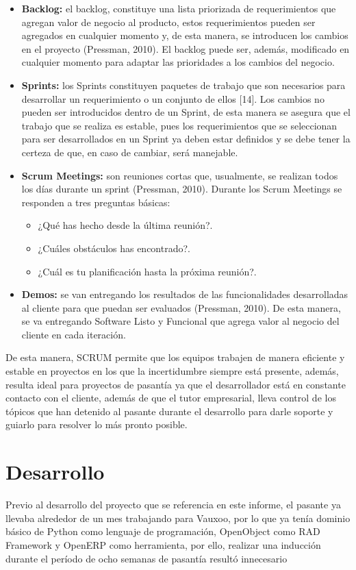 \documentclass[a4paper, 12pt]{article}
\begin{document}
\begin{itemize}
\item \textbf{Backlog:} el backlog, constituye una lista priorizada de requerimientos que agregan valor de negocio al producto, estos requerimientos pueden ser agregados en cualquier momento y, de esta manera, se introducen los cambios en el proyecto (Pressman, 2010). El backlog puede ser, además, modificado en cualquier momento para adaptar las prioridades a los cambios del negocio.
\item \textbf{Sprints:} los Sprints constituyen paquetes de trabajo que son necesarios para desarrollar un requerimiento o un conjunto de ellos [14]. Los cambios no pueden ser introducidos dentro de un Sprint, de esta manera se asegura que el trabajo que se realiza es estable, pues los requerimientos que se seleccionan para ser desarrollados en un Sprint ya deben estar definidos y se debe tener la certeza de que, en caso de cambiar, será manejable.
\item \textbf{Scrum Meetings:} son reuniones cortas que, usualmente, se realizan todos los días durante un sprint (Pressman, 2010). Durante los Scrum Meetings se responden a tres preguntas básicas:
\begin{itemize}
\item ¿Qué has hecho desde la última reunión?.
\item ¿Cuáles obstáculos has encontrado?.
\item ¿Cuál es tu planificación hasta la próxima reunión?.
\end{itemize}
\item \textbf{Demos:} se van entregando los resultados de las funcionalidades desarrolladas al cliente para que puedan ser evaluados (Pressman, 2010). De esta manera, se va entregando Software Listo y Funcional que agrega valor al negocio del cliente en cada iteración.
\end{itemize}

De esta manera, SCRUM permite que los equipos trabajen de manera eficiente y estable en proyectos en los que la incertidumbre siempre está presente, además, resulta ideal para proyectos de pasantía ya que el desarrollador está en constante contacto con el cliente, además de que el tutor empresarial, lleva control de los tópicos que han detenido al pasante durante el desarrollo para darle soporte y guiarlo para resolver lo más pronto posible.

\section{Desarrollo}
Previo al desarrollo del proyecto que se referencia en este informe, el pasante ya llevaba alrededor de un mes trabajando para Vauxoo, por lo que ya tenía dominio básico de Python como lenguaje de programación, OpenObject como RAD Framework y OpenERP como herramienta, por ello, realizar una inducción durante el período de ocho semanas de pasantía resultó innecesario
\end{document}
